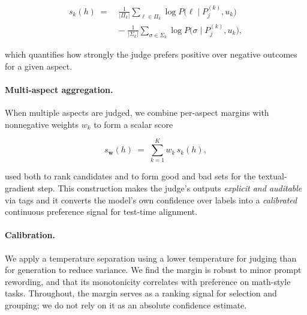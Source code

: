 \documentclass[letterpaper]{article} %
\begin{document}
  \begin{equation}
  \begin{aligned}
    s_k(h)\;=\;&\frac{1}{|\Pi_k|}\sum_{\ell\in\Pi_k}\log P\!\bigl(\ell\mid P^{(k)}_j,u_k\bigr)\\
    &-\;\frac{1}{|\Sigma_k|}\sum_{\sigma\in\Sigma_k}\log P\!\bigl(\sigma\mid P^{(k)}_j,u_k\bigr),
  \end{aligned}
  \end{equation}

which quantifies how strongly the judge prefers positive over negative outcomes for a given aspect.

\paragraph{Multi-aspect aggregation.} When multiple aspects are judged, we combine per-aspect margins with nonnegative weights \(w_k\) to form a scalar score

\begin{equation}
  s_{\mathbf{w}}(h)\;=\;\sum_{k=1}^{K} w_k\, s_k(h),
\end{equation}

used both to rank candidates and to form good and bad sets for the textual-gradient step. This construction makes the judge’s outputs \emph{explicit and auditable} via tags and it converts the model’s own confidence over labels into a \emph{calibrated} continuous preference signal for test-time alignment.

\paragraph{Calibration.} We apply a temperature separation using a lower temperature for judging than for generation to reduce variance. We find the margin is robust to minor prompt rewording, and that its monotonicity correlates with preference on math-style tasks. \textcolor{green!50!black}{Throughout, the margin serves as a ranking signal for selection and grouping; we do not rely on it as an absolute confidence estimate.}
\end{document}
